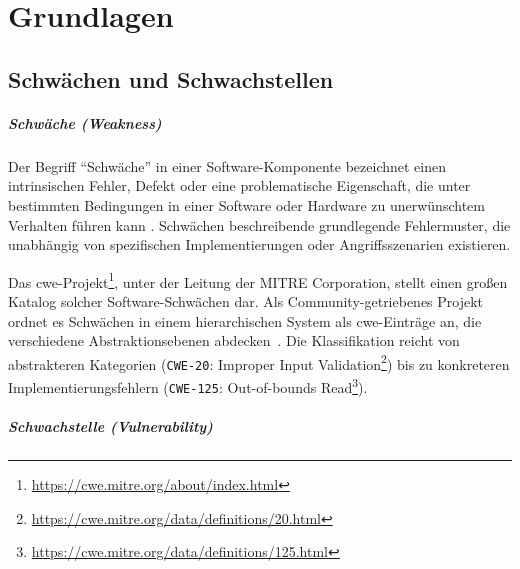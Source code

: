 \chapter{Grundlagen}\label{ch:grundlagen}


\section{Schwächen und Schwachstellen}\label{sec:def-weakness-vulnerability}


\paragraph{Schwäche (Weakness)}

Der Begriff \enquote{Schwäche} in einer Software-Komponente bezeichnet einen intrinsischen Fehler, Defekt oder eine problematische Eigenschaft, die unter bestimmten Bedingungen in einer Software oder Hardware zu unerwünschtem Verhalten führen kann \autocite{Ross_Winstead_McEvilley_2022}.
Schwächen beschreibende grundlegende Fehlermuster, die unabhängig von spezifischen Implementierungen oder Angriffsszenarien existieren.

Das \acrfull{cwe}-Projekt\footnote{\url{https://cwe.mitre.org/about/index.html}}, unter der Leitung der MITRE Corporation, stellt einen großen Katalog solcher Software-Schwächen dar.
Als Community-getriebenes Projekt ordnet es Schwächen in einem hierarchischen System als \acrshort{cwe}-Einträge an, die verschiedene Abstraktionsebenen abdecken\ \autocite{wu2016cwe}.
Die Klassifikation reicht von abstrakteren Kategorien (\verb+CWE-20+: Improper Input Validation\footnote{\url{https://cwe.mitre.org/data/definitions/20.html}}) bis zu konkreteren Implementierungsfehlern (\verb+CWE-125+: Out-of-bounds Read\footnote{\url{https://cwe.mitre.org/data/definitions/125.html}}).

\paragraph{Schwachstelle (Vulnerability)}

